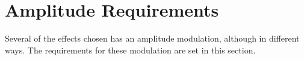 \section{Amplitude Requirements}\label{sec:reqAR}
Several of the effects chosen has an amplitude modulation, although in different ways. The requirements for these modulation are set in this section.